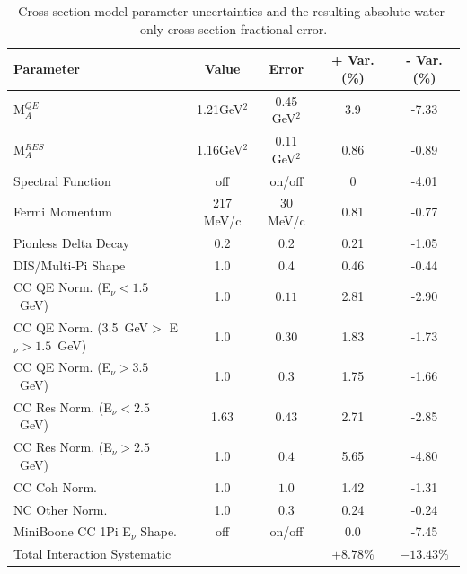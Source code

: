 \begin{table}[h]
\centering
\caption{Cross section model parameter uncertainties and the resulting absolute water-only cross section fractional error.}
\begin{tabular}{lcccc}\toprule\midrule
\renewcommand{\arraystretch}{1.1}
Parameter &  Value & Error & + Var. (\%) & - Var. (\%)
\\ \midrule
M$_A^{QE}$ & 1.21GeV$^2$ & 0.45 GeV$^2$ & 3.9 & -7.33\\
\midrule
M$_A^{RES}$ & 1.16GeV$^2$ & 0.11 GeV$^2$ & 0.86 & -0.89\\
\midrule
Spectral Function & off & on/off & 0 & -4.01\\
\midrule
Fermi Momentum & 217 MeV/c  & 30 MeV/c & 0.81 & -0.77\\
\midrule
Pionless Delta Decay & 0.2 & 0.2 & 0.21 & -1.05\\
\midrule
DIS/Multi-Pi Shape & 1.0 & 0.4 &  0.46 & -0.44\\
\midrule
CC QE Norm. (E$_\nu < 1.5$~GeV) & 1.0 & $0.11$ & 2.81 & -2.90\\
\midrule
CC QE Norm. (3.5~GeV$>$ E$_\nu > 1.5$~GeV) & 1.0 & $0.30$ & 1.83 & -1.73\\
\midrule
CC QE Norm. (E$_\nu > 3.5$~GeV) & 1.0 & $0.3$ & 1.75 & -1.66\\
\midrule
CC Res Norm. (E$_\nu < 2.5$~GeV) & 1.63 & $0.43$ & 2.71 & -2.85\\
\midrule
CC Res Norm. (E$_\nu > 2.5$~GeV) & 1.0 & $0.4$ & 5.65 & -4.80\\
\midrule
CC Coh Norm. & 1.0 & $1.0$ & 1.42 & -1.31\\
\midrule
NC Other Norm. & 1.0 & $0.3$ & 0.24 & -0.24\\
\midrule
MiniBoone CC 1Pi E$_\nu$ Shape. & off & on/off & 0.0 & -7.45\\
\midrule
\midrule
Total Interaction Systematic & &&$+8.78\% $  & $-13.43\%$  \\
\midrule
\bottomrule
\end{tabular}
\label{tab:XSecPar}
\end{table}

